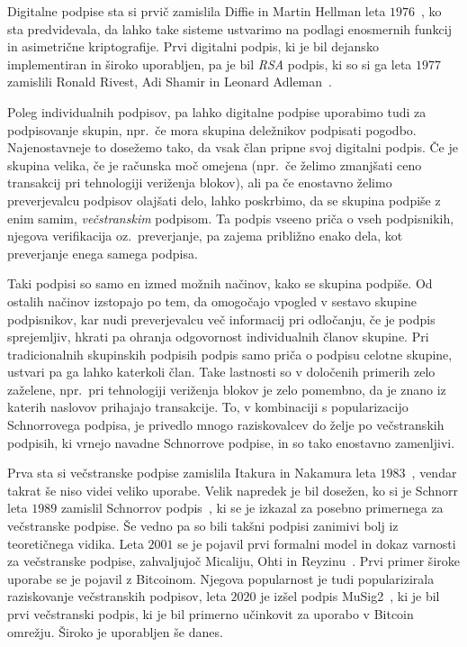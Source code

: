 \documentclass[isrm2, tisk]{fmfdelo}
\begin{document}
Digitalne podpise sta si prvič zamislila Diffie in Martin Hellman leta $1976$~\cite{diffie1976new},
ko sta predvidevala, da lahko take sisteme ustvarimo na podlagi enosmernih funkcij in asimetrične
kriptografije. Prvi digitalni podpis, ki je bil dejansko implementiran in široko uporabljen, pa je
bil \textit{RSA} podpis, ki so si ga leta $1977$ zamislili Ronald Rivest, Adi Shamir in Leonard
Adleman~\cite{rivest1978rsa}.

Poleg individualnih podpisov, pa lahko digitalne podpise uporabimo tudi za podpisovanje skupin, npr.\
če mora skupina deležnikov podpisati pogodbo. Najenostavneje to dosežemo tako, da vsak član pripne
svoj digitalni podpis. Če je skupina velika, če je računska moč omejena (npr.\ če želimo zmanjšati
ceno transakcij pri tehnologiji veriženja blokov), ali pa če enostavno želimo preverjevalcu podpisov
olajšati delo, lahko poskrbimo, da se skupina podpiše z enim samim, \textit{večstranskim} podpisom.
Ta podpis vseeno priča o vseh podpisnikih, njegova verifikacija oz.\ preverjanje, pa zajema približno
enako dela, kot preverjanje enega samega podpisa.

Taki podpisi so samo en izmed možnih načinov, kako se skupina podpiše. Od ostalih načinov izstopajo
po tem, da omogočajo vpogled v sestavo skupine podpisnikov, kar nudi preverjevalcu več informacij
pri odločanju, če je podpis sprejemljiv, hkrati pa ohranja odgovornost individualnih članov skupine.
Pri tradicionalnih skupinskih podpisih podpis samo priča o podpisu celotne skupine, ustvari pa ga
lahko katerkoli član. Take lastnosti so v določenih primerih zelo zaželene, npr.\ pri tehnologiji
veriženja blokov je zelo pomembno, da je znano iz katerih naslovov prihajajo transakcije. To, v
kombinaciji s popularizacijo Schnorrovega podpisa, je privedlo mnogo raziskovalcev do želje po
večstranskih podpisih, ki vrnejo navadne Schnorrove podpise, in so tako enostavno zamenljivi.

Prva sta si večstranske podpise zamislila Itakura in Nakamura leta $1983$~\cite{itakura1983multi},
vendar takrat še niso videi veliko uporabe. Velik napredek je bil dosežen, ko si je Schnorr leta
$1989$ zamislil Schnorrov podpis~\cite{schnorr1989sig}, ki se je izkazal za posebno primernega za
večstranske podpise. Še vedno pa so bili takšni podpisi zanimivi bolj iz teoretičnega vidika. Leta
$2001$ se je pojavil prvi formalni model in dokaz varnosti za večstranske podpise, zahvaljujoč
Micaliju, Ohti in Reyzinu~\cite{micali2001asm}. Prvi primer široke uporabe se je pojavil z Bitcoinom.
Njegova popularnost je tudi popularizirala raziskovanje večstranskih podpisov, leta $2020$ je izšel
podpis MuSig2~\cite{jonas2020musig2}, ki je bil prvi večstranski podpis, ki je bil primerno učinkovit
za uporabo v Bitcoin omrežju. Široko je uporabljen še danes.
\end{document}
